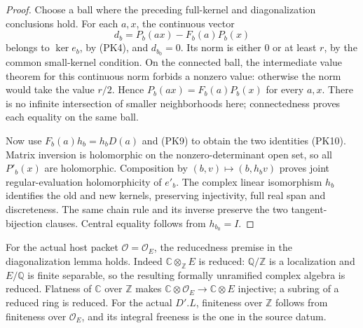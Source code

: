 \begin{proof}
Choose a ball where the preceding full-kernel and
diagonalization conclusions hold.
For each \(a,x\), the continuous vector
\[
                         d_b=P_b(ax)-F_b(a)P_b(x)
\]
belongs to \(\ker e_b\), by (PK4), and \(d_{b_0}=0\).
Its norm is either \(0\) or at least \(r\), by the common
small-kernel condition.
On the connected ball, the intermediate value theorem
for this continuous norm forbids a nonzero value:
otherwise the norm would take the value \(r/2\).
Hence \(P_b(ax)=F_b(a)P_b(x)\) for every \(a,x\).
There is no infinite intersection of smaller neighborhoods
here; connectedness proves each equality on the same ball.

Now use \(F_b(a)h_b=h_bD(a)\) and (PK9) to obtain the two
identities (PK10).
Matrix inversion is holomorphic on the nonzero-determinant
open set, so all \(P'_b(x)\) are holomorphic.
Composition by \((b,v)\mapsto(b,h_bv)\) proves joint
regular-evaluation holomorphicity of \(e'_b\).
The complex linear isomorphism \(h_b\) identifies the old
and new kernels, preserving injectivity, full real span
and discreteness.
The same chain rule and its inverse preserve the two
tangent-bijection clauses.
Central equality follows from \(h_{b_0}=I\).
\end{proof}

For the actual host packet \(\mathcal O=\mathcal O_E\),
the reducedness premise in the diagonalization lemma holds.
Indeed \(\mathbb C\otimes_{\mathbb Z}E\) is reduced:
\(\mathbb Q/\mathbb Z\) is a localization and
\(E/\mathbb Q\) is finite separable, so the resulting
formally unramified complex algebra is reduced.
Flatness of \(\mathbb C\) over \(\mathbb Z\) makes
\(\mathbb C\otimes\mathcal O_E\to\mathbb C\otimes E\)
injective; a subring of a reduced ring is reduced.
For the actual \(D'.L\), finiteness over \(\mathbb Z\)
follows from finiteness over \(\mathcal O_E\), and its
integral freeness is the one in the source datum.

